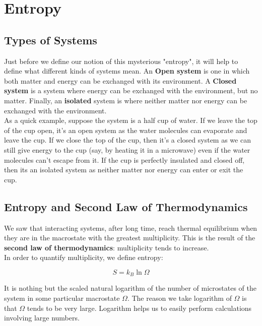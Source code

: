 \section{Entropy}

\subsection{Types of Systems}

Just before we define our notion of this mysterious "entropy", it will help to define what different kinds of systems mean. An \textbf{Open system} is one in which both matter and energy can be exchanged with its environment. A \textbf{Closed system} is a system where energy can be exchanged with the environment, but no matter. Finally, an \textbf{isolated} system is where neither matter nor energy can be exchanged with the environment. \\

As a quick example, suppose the system is a half cup of water. If we leave the top of the cup open, it's an open system as the water molecules can evaporate and leave the cup. If we close the top of the cup, then it's a closed system as we can still give energy to the cup (say, by heating it in a microwave) even if the water molecules can't escape from it. If the cup is perfectly insulated and closed off, then its an isolated system as neither matter nor energy can enter or exit the cup.

\subsection{Entropy and Second Law of Thermodynamics}

We saw that interacting systems, after long time, reach thermal equilibrium when they are in the macrostate with the greatest multiplicity. This is the result of the \textbf{second law of thermodynamics}: multiplicity tends to increase. \\

In order to quantify multiplicity, we define entropy:

\[ S=k_B\ln\Omega \]

It is nothing but the scaled natural logarithm of the number of microstates of the system in some particular macrostate $\Omega$. The reason we take logarithm of $\Omega$ is that $\Omega$ tends to be very large. Logarithm helps us to easily perform calculations involving large numbers. \\


